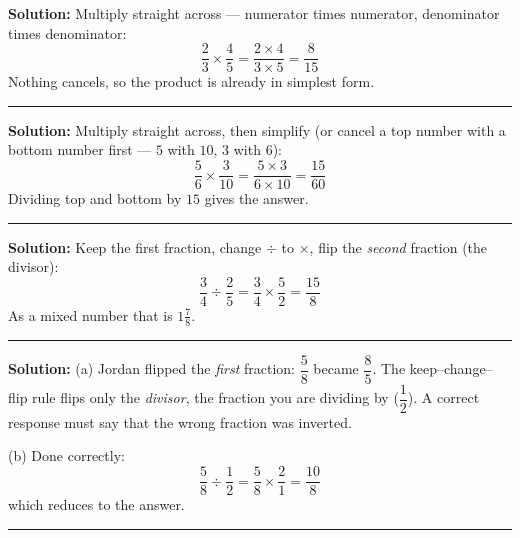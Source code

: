 \documentclass[12pt]{article}
\begin{document}



\textbf{Solution:} Multiply straight across --- numerator times numerator,
denominator times denominator:
\[ \frac{2}{3} \times \frac{4}{5} = \frac{2 \times 4}{3 \times 5} = \frac{8}{15} \]
Nothing cancels, so the product is already in simplest form. 

\vspace{0.2cm}\noindent\rule{\linewidth}{0.2pt}\vspace{0.1cm}


\textbf{Solution:} Multiply straight across, then simplify (or cancel a top
number with a bottom number first --- $5$ with $10$, $3$ with $6$):
\[ \frac{5}{6} \times \frac{3}{10} = \frac{5 \times 3}{6 \times 10}
   = \frac{15}{60} \]
Dividing top and bottom by $15$ gives the answer. 

\vspace{0.2cm}\noindent\rule{\linewidth}{0.2pt}\vspace{0.1cm}


\textbf{Solution:} Keep the first fraction, change $\div$ to $\times$, flip the
\emph{second} fraction (the divisor):
\[ \frac{3}{4} \div \frac{2}{5} = \frac{3}{4} \times \frac{5}{2}
   = \frac{15}{8} \]
As a mixed number that is $1\tfrac{7}{8}$. 

\vspace{0.2cm}\noindent\rule{\linewidth}{0.2pt}\vspace{0.1cm}


\textbf{Solution:}
(a) Jordan flipped the \emph{first} fraction: $\dfrac{5}{8}$ became
$\dfrac{8}{5}$. The keep--change--flip rule flips only the \emph{divisor}, the
fraction you are dividing by ($\dfrac{1}{2}$). A correct response must say that
the wrong fraction was inverted.

(b) Done correctly:
\[ \frac{5}{8} \div \frac{1}{2} = \frac{5}{8} \times \frac{2}{1} = \frac{10}{8} \]
which reduces to the answer. 

\vspace{0.2cm}\noindent\rule{\linewidth}{0.2pt}\vspace{0.1cm}
\end{document}
